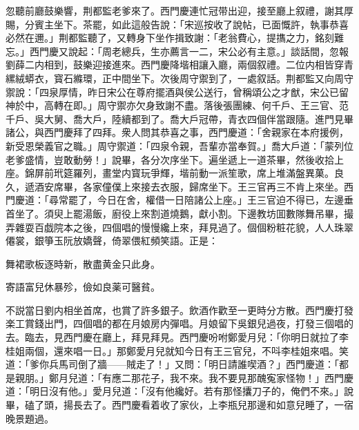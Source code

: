 忽聽前廳鼓樂響，荆都監老爹來了。西門慶連忙冠带出迎，接至廳上叙禮，謝其厚賜，分賓主坐下。茶罷，如此這般告說：「宋巡按收了說帖，已面慨許，執事恭喜必然在邇。」荆都監聽了，又轉身下坐作揖致謝：「老翁費心，提㩦之力，銘刻難忘。」西門慶又說起：「周老總兵，生亦薦言一二，宋公必有主意。」談話間，忽報劉薛二内相到，鼓樂迎接進來。西門慶降堦相讓入廳，兩個叙禮。二位内相皆穿青縲絨蟒衣，寳石縧環，正中間坐下。次後周守禦到了，一處叙話。荆都監又向周守禦說：「四泉厚情，昨日宋公在尊府擺酒與侯公送行，曾稱頌公之才猷，宋公已留神於中，高轉在即。」周守禦亦欠身致謝不盡。落後張團練、何千戶、王三官、范千戶、吳大舅、喬大戶，陸續都到了。喬大戶冠帶，青衣四個伴當跟隨。進門見畢諸公，與西門慶拜了四拜。衆人問其恭喜之事，西門慶道：「舍親家在本府援例，新受恩榮義官之職。」周守禦道：「四泉令親，吾輩亦當奉賀。」喬大戶道：「蒙列位老爹盛情，豈敢動勞！」說畢，各分次序坐下。遍坐遞上一道茶畢，然後收拾上座。錦屏前玳筵羅列，畫堂内寳玩爭輝，堦前動一派笙歌，席上堆滿盤異菓。良久，遞酒安席畢，各家僮僕上來接去衣服，歸席坐下。王三官再三不肯上來坐。西門慶道：「尋常罷了，今日在舍，權借一日陪諸公上座。」王三官迫不得已，左邊垂首坐了。須臾上罷湯飯，廚役上來割道燒鵝，獻小割。下邊教坊囬數隊舞吊畢，撮弄雜耍百戯院本之後，四個唱的慢慢纔上來，拜見過了。個個粉粧花貌，人人珠翠僊裳，銀箏玉阮放嬌聲，倚翠偎紅頻笑語。正是：

\begin{myquote}
舞裙歌板逐時新，散盡黄金只此身。

寄語富兒休暴殄，儉如良薬可醫貧。
\end{myquote}

不説當日劉内相坐首席，也賞了許多銀子。飲酒作歡至一更時分方散。西門慶打發楽工賞錢出門，四個唱的都在月娘房内彈唱。月娘留下吳銀兒過夜，打發三個唱的去。臨去，見西門慶在廳上，拜見拜見。西門慶吩咐鄭愛月兒：「你明日就拉了李桂姐兩個，還來唱一日。」那鄭愛月兒就知今日有王三官兒，不呌李桂姐來唱。笑道：「爹你兵馬司倒了牆——賊走了！」又問：「明日請誰喫酒？」西門慶道：「都是親朋。」鄭月兒道：「有應二那花子，我不來。我不要見那醜寃家怪物！」西門慶道：「明日沒有他。」愛月兒道：「沒有他纔好。若有那怪攮刀子的，俺們不來。」說畢，磕了頭，揚長去了。西門慶看着收了家伙，上李瓶兒那邊和如意兒睡了，一宿晚景題過。

